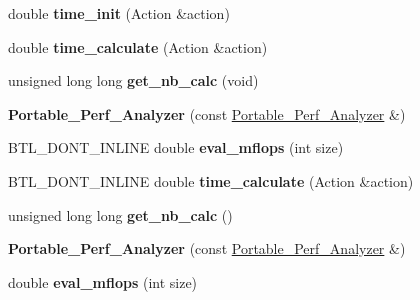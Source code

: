 \begin{DoxyCompactItemize}
\mbox{\label{class_portable___perf___analyzer_a71b2de0ccfa0ab1ef2e59821331821af}} 
double {\bfseries time\+\_\+init} (Action \&action)
\item 
\mbox{\label{class_portable___perf___analyzer_aebc0eee477594997c8e823e9066d558e}} 
double {\bfseries time\+\_\+calculate} (Action \&action)
\item 
\mbox{\label{class_portable___perf___analyzer_a075acb640706576bf727b8d3ac48c325}} 
unsigned long long {\bfseries get\+\_\+nb\+\_\+calc} (void)
\item 
\mbox{\label{class_portable___perf___analyzer_a7722dc21fa0a3934784f1a7dada50690}} 
{\bfseries Portable\+\_\+\+Perf\+\_\+\+Analyzer} (const \hyperlink{class_portable___perf___analyzer}{Portable\+\_\+\+Perf\+\_\+\+Analyzer} \&)
\item 
\mbox{\label{class_portable___perf___analyzer_a03155b3441f25085e43cb322be9937af}} 
B\+T\+L\+\_\+\+D\+O\+N\+T\+\_\+\+I\+N\+L\+I\+NE double {\bfseries eval\+\_\+mflops} (int size)
\item 
\mbox{\label{class_portable___perf___analyzer_a79a8450d03fa507442062882b4ef864f}} 
B\+T\+L\+\_\+\+D\+O\+N\+T\+\_\+\+I\+N\+L\+I\+NE double {\bfseries time\+\_\+calculate} (Action \&action)
\item 
\mbox{\label{class_portable___perf___analyzer_ae91f498b2c5b6d05eb6ae54458d5ff7f}} 
unsigned long long {\bfseries get\+\_\+nb\+\_\+calc} ()
\item 
\mbox{\label{class_portable___perf___analyzer_a7722dc21fa0a3934784f1a7dada50690}} 
{\bfseries Portable\+\_\+\+Perf\+\_\+\+Analyzer} (const \hyperlink{class_portable___perf___analyzer}{Portable\+\_\+\+Perf\+\_\+\+Analyzer} \&)
\item 
\mbox{\label{class_portable___perf___analyzer_a10688ff64fdaf9bcd34b7beec0a6ba3f}} 
double {\bfseries eval\+\_\+mflops} (int size)

\end{DoxyCompactItemize}
